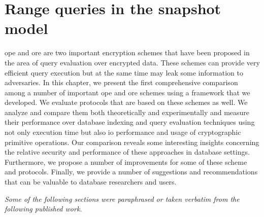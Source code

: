 \chapter{Range queries in the snapshot model}\label{section:range-snapshot}
\thispagestyle{myheadings}

	\acrfull{ope} and \acrfull{ore} are two important encryption schemes that have been proposed in the area of query evaluation over encrypted data.
	These schemes can provide very efficient query execution but at the same time may leak some information to adversaries.
	In this chapter, we present the first comprehensive comparison among a number of important \acrshort{ope} and \acrshort{ore} schemes using a framework that we developed.
	We evaluate protocols that are based on these schemes as well.
	We analyze and compare them both theoretically and experimentally and measure their performance over database indexing and query evaluation techniques using not only execution time but also \acrshort{io} performance and usage of cryptographic primitive operations.
	Our comparison reveals some interesting insights concerning the relative security and performance of these approaches in database settings.
	Furthermore, we propose a number of improvements for some of these scheme and protocols.
	Finally, we provide a number of suggestions and recommendations that can be valuable to database researchers and users.

	\emph{Some of the following sections were paraphrased or taken verbatim from the following published work.}

	\cite{ore-benchmark-17} 

	

	

	

	
